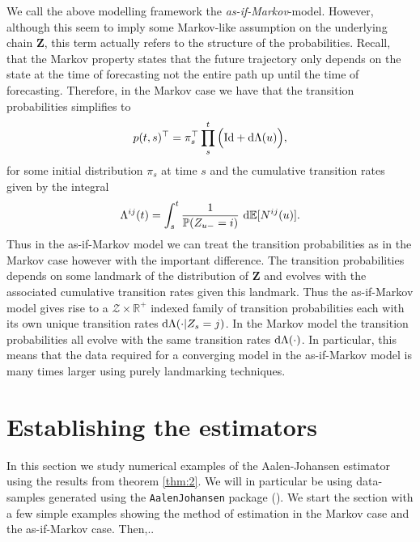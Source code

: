 \documentclass[12pt,letter,twoside]{article}
\theoremstyle{plain}
\theoremstyle{definition}
\theoremstyle{remark}
\newcounter{example}
\begin{document}
We call the above modelling framework the \textit{as-if-Markov}-model. However, although this seem to imply some Markov-like assumption on the underlying chain $\mathbf Z$, this term actually refers to the structure of the probabilities. Recall, that the Markov property states that the future trajectory only depends on the state at the time of forecasting not the entire path up until the time of forecasting. Therefore, in the Markov case we have that the transition probabilities simplifies to
\begin{align}
p(t,s)^\top=\pi_s^\top\prod_s^t\Big(\text{Id} + \text d\Lambda(u)\Big),
\end{align}
for some initial distribution $\pi_s$ at time $s$ and the cumulative transition rates given by the integral
\begin{align}
\Lambda^{ij}(t)=\int_s^t\frac{1}{\mathbb P(Z_{u-}=i)}\ \text d\mathbb E[N^{ij}(u)].
\end{align}
Thus in the as-if-Markov model we can treat the transition probabilities as in the Markov case however with the important difference. The transition probabilities depends on some landmark of the distribution of $\mathbf Z$ and evolves with the associated cumulative transition rates given this landmark. Thus the as-if-Markov model gives rise to a $\mathcal Z\times \mathbb R^+$ indexed family of transition probabilities each with its own unique transition rates $\text d\Lambda(\cdot\vert Z_s=j)$. In the Markov model the transition probabilities all evolve with the same transition rates $\text d\Lambda(\cdot)$. In particular, this means that the data required for a converging model in the as-if-Markov model is many times larger using purely landmarking techniques.

\section{Establishing the estimators}
In this section we study numerical examples of the Aalen-Johansen estimator using the results from theorem \ref{thm:2}. We will in particular be using data-samples generated using the \texttt{AalenJohansen} package (\cite{aalenR}). We start the section with a few simple examples showing the method of estimation in the Markov case and the as-if-Markov case. Then,..
\end{document}
